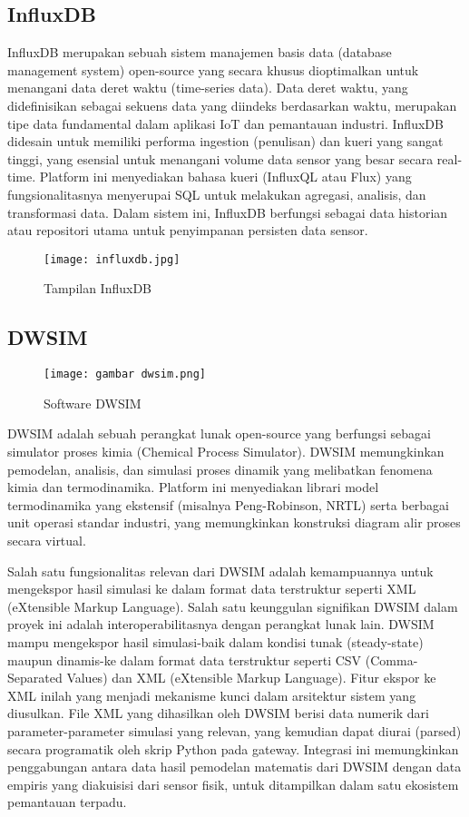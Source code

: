 \documentclass[a4paper, 12pt]{article}
\begin{document}
\subsection{InfluxDB}
InfluxDB merupakan sebuah sistem manajemen basis data (database management system) open-source yang secara khusus dioptimalkan untuk menangani data deret waktu (time-series data). Data deret waktu, yang didefinisikan sebagai sekuens data yang diindeks berdasarkan waktu, merupakan tipe data fundamental dalam aplikasi IoT dan pemantauan industri. InfluxDB didesain untuk memiliki performa ingestion (penulisan) dan kueri yang sangat tinggi, yang esensial untuk menangani volume data sensor yang besar secara real-time. Platform ini menyediakan bahasa kueri (InfluxQL atau Flux) yang fungsionalitasnya menyerupai SQL untuk melakukan agregasi, analisis, dan transformasi data. Dalam sistem ini, InfluxDB berfungsi sebagai data historian atau repositori utama untuk penyimpanan persisten data sensor.

\begin{figure}[H]
    \centering
    \texttt{[image: influxdb.jpg]} 
    \caption{Tampilan InfluxDB}
\end{figure}

\subsection{DWSIM}

\begin{figure}[H]
    \centering
    \texttt{[image: gambar dwsim.png]} 
    \caption{Software DWSIM}
\end{figure}

DWSIM adalah sebuah perangkat lunak open-source yang berfungsi sebagai simulator proses kimia (Chemical Process Simulator). DWSIM memungkinkan pemodelan, analisis, dan simulasi proses dinamik yang melibatkan fenomena kimia dan termodinamika. Platform ini menyediakan librari model termodinamika yang ekstensif (misalnya Peng-Robinson, NRTL) serta berbagai unit operasi standar industri, yang memungkinkan konstruksi diagram alir proses secara virtual. 

Salah satu fungsionalitas relevan dari DWSIM adalah kemampuannya untuk mengekspor hasil simulasi ke dalam format data terstruktur seperti XML (eXtensible Markup Language). Salah satu keunggulan signifikan DWSIM dalam proyek ini adalah interoperabilitasnya dengan perangkat lunak lain. DWSIM mampu mengekspor hasil simulasi-baik dalam kondisi tunak (steady-state) maupun dinamis-ke dalam format data terstruktur seperti CSV (Comma-Separated Values) dan XML (eXtensible Markup Language). Fitur ekspor ke XML inilah yang menjadi mekanisme kunci dalam arsitektur sistem yang diusulkan. File XML yang dihasilkan oleh DWSIM berisi data numerik dari parameter-parameter simulasi yang relevan, yang kemudian dapat diurai (parsed) secara programatik oleh skrip Python pada gateway. Integrasi ini memungkinkan penggabungan antara data hasil pemodelan matematis dari DWSIM dengan data empiris yang diakuisisi dari sensor fisik, untuk ditampilkan dalam satu ekosistem pemantauan terpadu.
\end{document}
